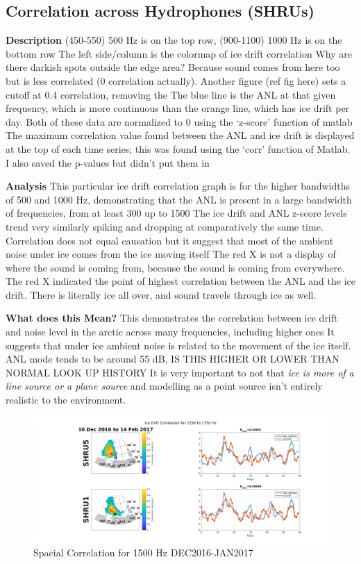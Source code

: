 \subsection{Correlation across Hydrophones (SHRUs)}

\textbf{Description}
(450-550) 500 Hz is on the top row, (900-1100) 1000 Hz is on the bottom row
The left side/column is the colormap of ice drift correlation
Why are there darkish spots outside the edge area? Because sound comes from here too but is less correlated (0 correlation actually). Another figure (ref fig here) sets a cutoff at 0.4 correlation, removing the 
The blue line is the ANL at that given frequency, which is more continuous than the orange line, which has ice drift per day. Both of these data are normalized to 0 using the ‘z-score’ function of matlab
The maximum correlation value found between the ANL and ice drift is displayed at the top of each time series; this was found using the ‘corr’ function of Matlab. I also saved the p-values but didn’t put them in

\textbf{Analysis}
This particular ice drift correlation graph is for the higher bandwidths of 500 and 1000 Hz, demonstrating that the ANL is present in a large bandwidth of frequencies, from at least 300 up to 1500
The ice drift and ANL z-score levels trend very similarly spiking and dropping at comparatively the same time. Correlation does not equal causation but it suggest that most of the ambient noise under ice comes from the ice moving itself
The red X is not a display of where the sound is coming from, because the sound is coming from everywhere. The red X indicated the point of highest correlation between the ANL and the ice drift. There is literally ice all over, and sound travels through ice as well.

\textbf{What does this Mean?}
This demonstrates the correlation between ice drift and noise level in the arctic across many frequencies, including higher ones
It suggests that under ice ambient noise is related to the movement of the ice itself. ANL mode tends to be around 55 dB, IS THIS HIGHER OR LOWER THAN NORMAL LOOK UP HISTORY
It is very important to not that \textit{ice is more of a line source or a plane source} and modelling as a point source isn't entirely realistic to the environment.

\begin{figure}[h]
\centering
\includegraphics[scale=0.4]{Figures/spatial_corr_20161216-20170214.png}
\caption{Spacial Correlation for 1500 Hz DEC2016-JAN2017}
\label{fig_1500corr}
\end{figure}


